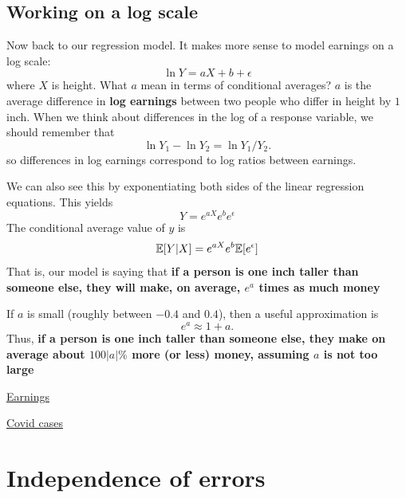  

\subsection{Working on a log scale}
Now back to our regression model. It makes more sense to model earnings on a log scale:
\begin{equation}
\ln Y = a X + b + \epsilon
\end{equation}
where $X$ is height. What $a$ mean in terms of conditional averages? $a$ is the average difference in {\bf log earnings} between two people who differ in height by $1$ inch. When we think about differences in the log of a response variable, we should remember that
\begin{equation}
\ln Y_1 - \ln Y_2 = \ln Y_1/Y_2. 
\end{equation}
so differences in log earnings correspond to log ratios between earnings. 

We can also see this by exponentiating both sides of the linear regression equations. This yields
\begin{equation}
Y = e^{a X} e^b e^{\epsilon}
\end{equation}
The conditional average value of $y$ is 
\begin{equation}
\mathbb E[Y|X] = e^{a X} e^b \mathbb E[e^{\epsilon}]
\end{equation}
That is, our model is saying that {\bf if a person is one inch taller than someone else, they will make, on average, $e^{a}$ times as much money}

If $a$ is small (roughly between $-0.4$ and $0.4$), then a useful approximation is 
\begin{equation}
e^{a} \approx 1 + a. 
\end{equation}
Thus, {\bf if a person is one inch taller than someone else, they make on average about $100|a|\%$ more (or less) money, assuming $a$ is not too large}


\begin{example}
\href{https://colab.research.google.com/drive/1bBeb3k5xEjGInFtjhB7X8B0LXqkGI0Tn?usp=sharing}{Earnings}
\end{example}

\begin{example}
\href{https://colab.research.google.com/drive/1bBeb3k5xEjGInFtjhB7X8B0LXqkGI0Tn?usp=sharing}{Covid cases}
\end{example}


\section{Independence of errors}

